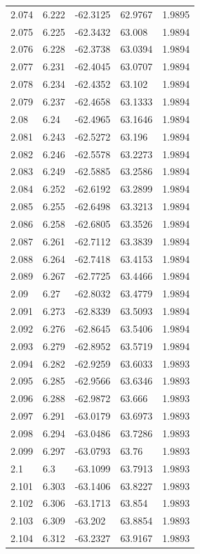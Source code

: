 \begin{tabular}{lllll}
2.074 & 6.222 & -62.3125 & 62.9767 & 1.9895 \\
2.075 & 6.225 & -62.3432 & 63.008 & 1.9894 \\
2.076 & 6.228 & -62.3738 & 63.0394 & 1.9894 \\
2.077 & 6.231 & -62.4045 & 63.0707 & 1.9894 \\
2.078 & 6.234 & -62.4352 & 63.102 & 1.9894 \\
2.079 & 6.237 & -62.4658 & 63.1333 & 1.9894 \\
2.08 & 6.24 & -62.4965 & 63.1646 & 1.9894 \\
2.081 & 6.243 & -62.5272 & 63.196 & 1.9894 \\
2.082 & 6.246 & -62.5578 & 63.2273 & 1.9894 \\
2.083 & 6.249 & -62.5885 & 63.2586 & 1.9894 \\
2.084 & 6.252 & -62.6192 & 63.2899 & 1.9894 \\
2.085 & 6.255 & -62.6498 & 63.3213 & 1.9894 \\
2.086 & 6.258 & -62.6805 & 63.3526 & 1.9894 \\
2.087 & 6.261 & -62.7112 & 63.3839 & 1.9894 \\
2.088 & 6.264 & -62.7418 & 63.4153 & 1.9894 \\
2.089 & 6.267 & -62.7725 & 63.4466 & 1.9894 \\
2.09 & 6.27 & -62.8032 & 63.4779 & 1.9894 \\
2.091 & 6.273 & -62.8339 & 63.5093 & 1.9894 \\
2.092 & 6.276 & -62.8645 & 63.5406 & 1.9894 \\
2.093 & 6.279 & -62.8952 & 63.5719 & 1.9894 \\
2.094 & 6.282 & -62.9259 & 63.6033 & 1.9893 \\
2.095 & 6.285 & -62.9566 & 63.6346 & 1.9893 \\
2.096 & 6.288 & -62.9872 & 63.666 & 1.9893 \\
2.097 & 6.291 & -63.0179 & 63.6973 & 1.9893 \\
2.098 & 6.294 & -63.0486 & 63.7286 & 1.9893 \\
2.099 & 6.297 & -63.0793 & 63.76 & 1.9893 \\
2.1 & 6.3 & -63.1099 & 63.7913 & 1.9893 \\
2.101 & 6.303 & -63.1406 & 63.8227 & 1.9893 \\
2.102 & 6.306 & -63.1713 & 63.854 & 1.9893 \\
2.103 & 6.309 & -63.202 & 63.8854 & 1.9893 \\
2.104 & 6.312 & -63.2327 & 63.9167 & 1.9893 \\

\end{tabular}
